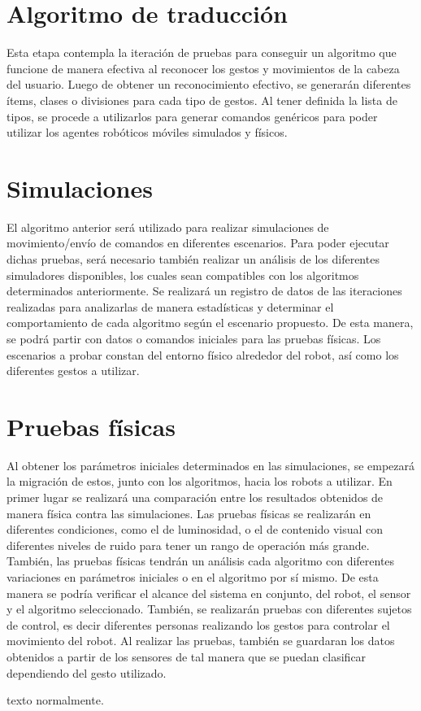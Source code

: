 \chapter{Algoritmo de traducción}

Esta etapa contempla la iteración de pruebas para conseguir un algoritmo que funcione de manera efectiva al reconocer los gestos y movimientos de la cabeza del usuario. Luego de obtener un reconocimiento efectivo, se generarán diferentes ítems, clases o divisiones para cada tipo de gestos. Al tener definida la lista de tipos, se procede a utilizarlos para generar comandos genéricos para poder utilizar los agentes robóticos móviles simulados y físicos.

\chapter{Simulaciones}

El algoritmo anterior será utilizado para realizar simulaciones de movimiento/envío de comandos en diferentes escenarios. Para poder ejecutar dichas pruebas, será necesario también realizar un análisis de los diferentes simuladores disponibles, los cuales sean compatibles con los algoritmos determinados anteriormente. Se realizará un registro de datos de las iteraciones realizadas para analizarlas de manera estadísticas y determinar el comportamiento de cada algoritmo según el escenario propuesto. De esta manera, se podrá partir con datos o comandos iniciales para las pruebas físicas. Los escenarios a probar constan del entorno físico alrededor del robot, así como los diferentes gestos a utilizar. 

\chapter{Pruebas físicas}

Al obtener los parámetros iniciales determinados en las simulaciones, se empezará la migración de estos, junto con los algoritmos, hacia los robots a utilizar. En primer lugar se realizará una comparación entre los resultados obtenidos de manera física contra las simulaciones. Las pruebas físicas se realizarán en diferentes condiciones, como el de luminosidad, o el de contenido visual con diferentes niveles de ruido para tener un rango de operación más grande. También, las pruebas físicas tendrán un análisis cada algoritmo con diferentes variaciones en parámetros iniciales o en el algoritmo por sí mismo. De esta manera se podría verificar el alcance del sistema en conjunto, del robot, el sensor y el algoritmo seleccionado. También, se realizarán pruebas con diferentes sujetos de control, es decir diferentes personas realizando los gestos para controlar el movimiento del robot. Al realizar las pruebas, también se guardaran los datos obtenidos a partir de los sensores de tal manera que se puedan clasificar dependiendo del gesto utilizado. 

texto normalmente.